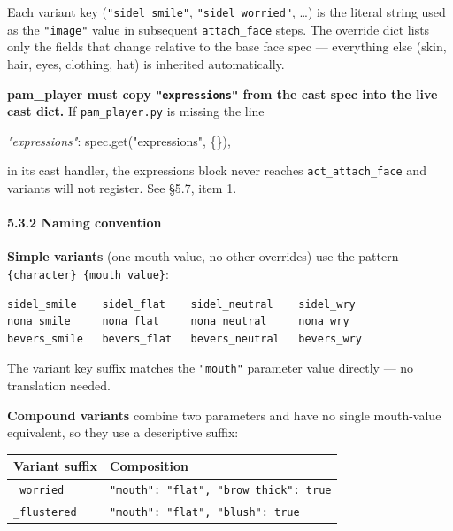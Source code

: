 \documentclass[
  11pt,
]{book}
\newenvironment{Shaded}{}{}
\newcommand{\CommentTok}[1]{\textcolor[rgb]{0.38,0.63,0.69}{\textit{#1}}}
\newcommand{\NormalTok}[1]{#1}
\newcommand{\StringTok}[1]{\textcolor[rgb]{0.25,0.44,0.63}{#1}}
\begin{document}
Each variant key (\texttt{"sidel\_smile"}, \texttt{"sidel\_worried"},
\ldots) is the literal string used as the \texttt{"image"} value in
subsequent \texttt{attach\_face} steps. The override dict lists only the
fields that change relative to the base face spec --- everything else
(skin, hair, eyes, clothing, hat) is inherited automatically.

\textbf{pam\_player must copy \texttt{"expressions"} from the cast spec
into the live cast dict.} If \texttt{pam\_player.py} is missing the line

\begin{Shaded}
\begin{Highlighting}[]
\CommentTok{"expressions"}\NormalTok{: spec.get(}\StringTok{"expressions"}\NormalTok{, \{\}),}
\end{Highlighting}
\end{Shaded}

in its cast handler, the expressions block never reaches
\texttt{act\_attach\_face} and variants will not register. See §5.7,
item 1.

\paragraph{5.3.2 Naming convention}\label{naming-convention}

\textbf{Simple variants} (one mouth value, no other overrides) use the
pattern \texttt{\{character\}\_\{mouth\_value\}}:

\begin{verbatim}
sidel_smile    sidel_flat    sidel_neutral    sidel_wry
nona_smile     nona_flat     nona_neutral     nona_wry
bevers_smile   bevers_flat   bevers_neutral   bevers_wry
\end{verbatim}

The variant key suffix matches the \texttt{"mouth"} parameter value
directly --- no translation needed.

\textbf{Compound variants} combine two parameters and have no single
mouth-value equivalent, so they use a descriptive suffix:

\begin{longtable}[]{@{}ll@{}}
\toprule\noalign{}
Variant suffix & Composition \\
\midrule\noalign{}
\endhead
\bottomrule\noalign{}
\endlastfoot
\texttt{\_worried} & \texttt{"mouth":\ "flat",\ "brow\_thick":\ true} \\
\texttt{\_flustered} & \texttt{"mouth":\ "flat",\ "blush":\ true} \\
\end{longtable}
\end{document}
